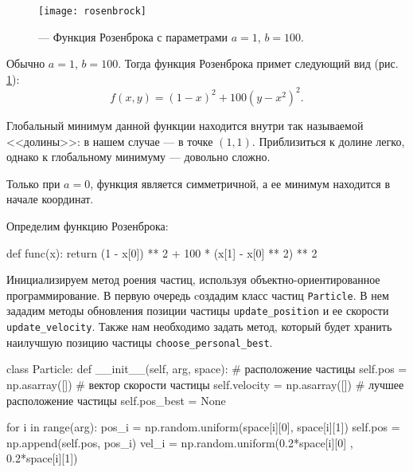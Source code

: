 \begin{figure}[ht]
	\centering
  \texttt{[image: rosenbrock]}
  \caption{ --- Функция Розенброка с параметрами $a = 1$, $b = 100$.}
  \label{img:rosenbrock}
\end{figure}


Обычно $a = 1$, $b=100$. Тогда функция Розенброка примет следующий вид (рис. \ref{img:rosenbrock}):
\[
	f(x, y) = (1 - x)^2 + 100(y-x^2)^2.
\]

Глобальный минимум данной функции находится внутри так называемой <<долины>>: в нашем случае --- в точке $(1, 1)$. Приблизиться к долине легко, однако к глобальному минимуму --- довольно сложно.

Только при $a = 0$, функция является симметричной, а ее минимум находится в начале координат.

Определим функцию Розенброка:
\begin{pyin}
def func(x):
  return (1 - x[0]) ** 2 + 100 * (x[1] - x[0] ** 2) ** 2
\end{pyin}

Инициализируем метод роения частиц, используя объектно-ориентированное программирование. В первую очередь cоздадим класс частиц \texttt{Particle}. В нем зададим методы обновления позиции частицы \texttt{update\_position} и ее скорости \texttt{update\_velocity}. Также нам необходимо задать метод, который будет хранить наилучшую позицию частицы \texttt{choose\_personal\_best}.

\begin{pyin}
class Particle:
  def __init__(self, arg, space):
    # расположение частицы
    self.pos = np.asarray([])
    # вектор скорости частицы
    self.velocity = np.asarray([])
    # лучшее расположение частицы
		self.pos_best = None

    for i in range(arg):
       pos_i = np.random.uniform(space[i][0], space[i][1])
       self.pos = np.append(self.pos, pos_i)
       vel_i = np.random.uniform(0.2*space[i][0] , 0.2*space[i][1])
\end{pyin}

